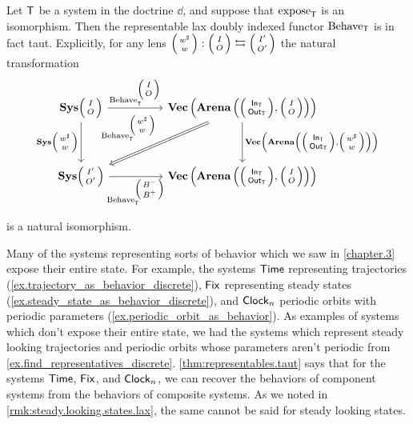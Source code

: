 \documentclass[DynamicalBook]{subfiles}
\begin{document}
\begin{theorem}\label{thm:representables.taut}
Let $\mathsf{T}$ be a system in the doctrine $\dd$, and suppose that $\mathrm{expose}_{\mathsf{T}}$
is an isomorphism. Then the representable lax doubly indexed functor
$\mathrm{Behave}_{\mathsf{T}}$ is in fact taut. Explicitly, for any lens
$\lens{w^{\sharp}}{w} : \lens{I}{O} \fromto \lens{I'}{O'}$ the natural transformation
  \[
    \begin{tikzcd}
\Cat{Sys}\lens{I}{O} \ar[dd, "{\Cat{Sys}\littlelens{w^{\sharp}}{w}}"'] \ar[rr, "{\Fun{Behave}_{\Sys{T}}^{\littlelens{I}{O}}}"] & & \Cat{Vec}\left( \Cat{Arena}\left(
    \littlelens{\In{T}}{\Out{T}}, \littlelens{I}{O} \right) \right) \ar[dd, "{\Cat{Vec}\left(
  \Cat{Arena}\left( \littlelens{\In{T}}{\Out{T}}, \littlelens{w^{\sharp}}{w}
  \right)\right)}"] \ar[ddll, Rightarrow, "{\Fun{Behave}_{\Sys{T}}^{\littlelens{w^{\sharp}}{w}}}"']\\
 & & \\
\Cat{Sys}\lens{I'}{O'}  \ar[rr, "{\Fun{Behave}_{\Sys{T}}^{\littlelens{B^-}{B^+}} }"']& & \Cat{Vec}\left( \Cat{Arena}\left(
    \littlelens{\In{T}}{\Out{T}}, \littlelens{I}{O} \right) \right) \\
    \end{tikzcd}
\]
is a natural isomorphism.
\end{theorem}

Many of the systems representing sorts of behavior which we saw in
\cref{chapter.3} expose their entire state. For example, the systems $\mathsf{Time}$
representing trajectories (\cref{ex.trajectory_as_behavior_discrete}), $\mathsf{Fix}$ representing steady
states (\cref{ex.steady_state_as_behavior_discrete}), and $\mathsf{Clock}_n$ periodic orbits with periodic parameters (\cref{ex.periodic_orbit_as_behavior}). As examples of
systems which don't expose their entire state, we had the systems which
represent steady looking trajectories and periodic orbits whose parameters
aren't periodic from \cref{ex.find_representatives_discrete}.
\cref{thm:representables.taut} says that for the systems $\mathsf{Time}$,
$\mathsf{Fix}$, and $\mathsf{Clock}_n$, we can recover the behaviors of component
systems from the behaviors of composite systems. As we noted in
\cref{rmk:steady.looking.states.lax}, the same cannot be said for steady looking states.
\end{document}
